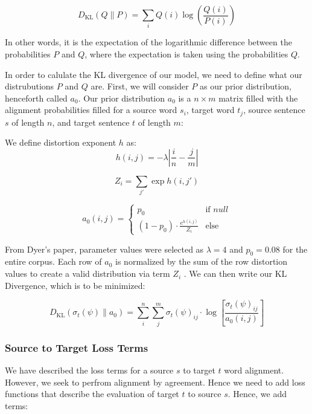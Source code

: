 \documentclass[twoside,twocolumn]{article}
\begin{document}
\begin{equation}
D _ { \mathrm { KL } } ( Q \| P ) = \sum _ { i } Q ( i ) \log \left( \frac { Q ( i ) } { P ( i ) } \right)
\end{equation}

In other words, it is the expectation of the logarithmic difference between the probabilities $P$ and $Q$, where the expectation is taken using the probabilities $Q$.

In order to calulate the KL divergence of our model, we need to define what our distrubutions $P$ and $Q$ are. First, we will consider $P$ as our prior distribution, henceforth called $a_0$. Our prior distribution $a_0$ is a $n \times m$ matrix filled with the alignment probabilities filled for a source word $s_i$, target word $t_j$, source sentence $s$ of length $n$, and target sentence $t$ of length $m$:

We define distortion exponent $h$ as:
\begin{equation}
  h(i, j) = {-\lambda \left| \frac{i}{n} - \frac{j}{m}\right|}
\end{equation}

\begin{equation}
  Z_i = \sum_{j'} \exp h(i, j')
\end{equation}

\begin{equation}
a_0 (i, j) =
\begin{cases}
      p_0 & \text{if } null \\
     (1-p_0) \cdot \frac{e^{h(i,j)}}{Z_i} & \text{else}
   \end{cases}
\end{equation}

From Dyer's paper, parameter values were selected as $\lambda=4$ and $p_0=0.08$ for the entire corpus. Each row of $a_0$ is normalized by the sum of the row distortion values to create a valid distribution via term $Z_i$ \cite{dyer2013simple}. We can then write our KL Divergence, which is to be minimized:

\begin{equation}
  D_{\mathrm{KL}} (  \sigma_t(\psi) \| a_0) = \sum_i^n \sum_j^m \sigma_t(\psi)_{ij}  \cdot \log \left[ \frac{\sigma_t(\psi)_{ij}}{a_0(i, j)} \right]
\end{equation}



\subsubsection{Source to Target Loss Terms}
We have described the loss terms for a source $s$ to target $t$ word alignment. However, we seek to perfrom alignment by agreement. Hence we need to add loss functions that describe the evaluation of target $t$ to source $s$. Hence, we add terms:
\end{document}
